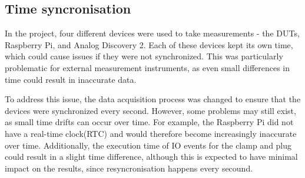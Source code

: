 \subsection{Time syncronisation}
In the project, four different devices were used to take measurements - the DUTs, Raspberry Pi, and Analog Discovery 2. Each of these devices kept its own time, which could cause issues if they were not synchronized. This was particularly problematic for external measurement instruments, as even small differences in time could result in inaccurate data.

To address this issue, the data acquisition process was changed to ensure that the devices were synchronized every second. However, some problems may still exist, as small time drifts can occur over time. For example, the Raspberry Pi did not have a real-time clock(RTC)\cite{RTCRasp} and would therefore become increasingly inaccurate over time. Additionally, the execution time of IO events for the clamp and plug could result in a slight time difference, although this is expected to have minimal impact on the results, since resyncronisation happens every secound.



